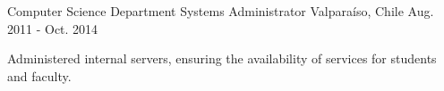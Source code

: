 \begin{cventries}
  \cventry
    {Computer Science Department}
    {Systems Administrator}
    {Valparaíso, Chile}
    {Aug. 2011 - Oct. 2014}
    {
      \begin{cvitems}
        \item{Administered internal servers, ensuring the availability of services for students and faculty.}
      \end{cvitems}
    }
\end{cventries}
